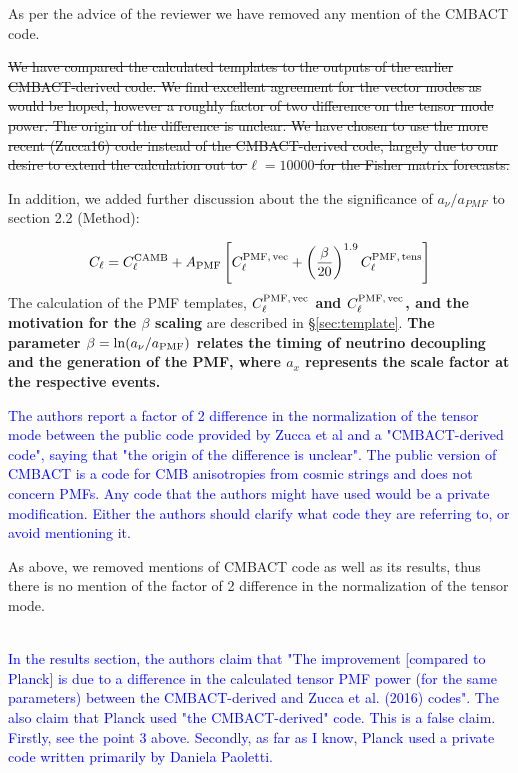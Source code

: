 \documentclass{article}
\newcommand{\cpmftens}{\ensuremath{C_{\ell}^{\rm PMF,\,tens}}}
\newcommand{\cpmfvec}{\ensuremath{C_{\ell}^{\rm PMF,\,vec}}}
\newcommand{\apmf}{\ensuremath{A_{\rm PMF}}}
\newcommand{\be}{\begin{equation}}
\newcommand{\ee}{\end{equation}}
\newcommand{\removed}[1]{\st{#1}}
\newcommand{\added}[1]{\textbf{#1}}
\newcommand{\reviewer}[1]{\textcolor{Blue}{#1}}
\newcommand{\diff}[1]{\textcolor{PineGreen}{#1}}
\begin{document}
As per the advice of the reviewer we have removed any mention of the CMBACT code.

\diff{
\removed{
We have compared the calculated templates to the outputs of the earlier CMBACT-derived code.
We find excellent agreement  for the vector modes as would be hoped, however a roughly factor of two difference on the tensor mode power. 
The origin of the difference is unclear.
We have chosen to use the more recent (Zucca16) code instead of the CMBACT-derived code, largely due to our desire to extend the calculation out to $\ell=10000$ for the Fisher matrix forecasts.}}

In addition, we added further discussion about the the significance of $a_{\nu}/a_{PMF}$ to section 2.2 (Method):

\diff{
\be
C_\ell = C_\ell^{\rm{CAMB}} + \apmf \left[\cpmfvec + \left(\frac{\beta}{20}\right)^{1.9}  \cpmftens \right]
\ee
The calculation of the PMF templates,\added{ \cpmfvec{} and \cpmfvec{}, and the motivation for the $\beta$ scaling} are described in \S\ref{sec:template}. 
\added{The parameter $\beta = {\rm ln}(a_{\nu}/a_{\rm{PMF}})$ relates the timing of neutrino decoupling and the generation of the PMF, where $a_x$ represents the scale factor at the respective events.}}

\reviewer{The authors report a factor of 2 difference in the normalization of the tensor mode between the public code provided by Zucca et al and a "CMBACT-derived code", saying that "the origin of the difference is unclear". The public version of CMBACT is a code for CMB anisotropies from cosmic strings and does not concern PMFs. Any code that the authors might have used would be a private modification. Either the authors should clarify what code they are referring to, or avoid mentioning it.}

As above, we removed mentions of CMBACT code as well as its results, thus there is no mention of the factor of 2 difference in the normalization of the tensor mode.

\diff{}
\\

\reviewer{In the results section, the authors claim that "The improvement [compared to Planck] is due to a difference in the calculated tensor PMF power (for the same
parameters) between the CMBACT-derived and Zucca et al. (2016) codes". The also claim that Planck used "the CMBACT-derived" code. This is a false claim. Firstly, see the point 3 above. Secondly, as far as I know, Planck used a private code written primarily by Daniela Paoletti.}
\end{document}
